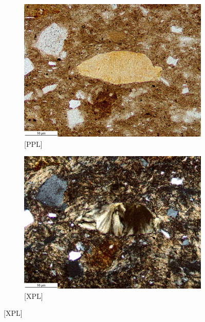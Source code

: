 \documentclass[a4paper]{article}
\begin{document}
\begin{figure}[H]
\begin{subfigure}[t]{.49\textwidth}
		\includegraphics[width=\textwidth]{ThinSections/42-4_20x_PPL.jpg}
		\caption{[PPL]}
	\end{subfigure}\hspace{.5em}\hfill
	\begin{subfigure}[t]{.49\textwidth}
		\includegraphics[width=\textwidth]{ThinSections/42-4_20x_XPL.jpg}
		\caption{[XPL]}
	\end{subfigure}

\end{figure}
\end{document}
